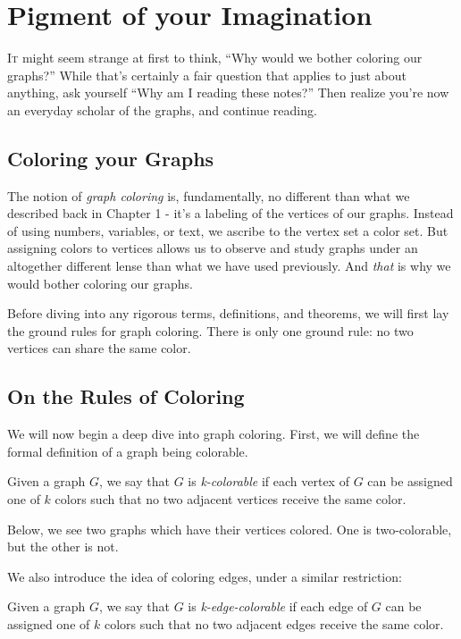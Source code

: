 \chapter{Pigment of your Imagination}
\lettrine[lines=4]{I}{t} might seem strange at first to think, ``Why would we bother coloring our graphs?'' While that's certainly a fair question that applies to just about anything, ask yourself ``Why am I reading these notes?'' Then realize you're now an everyday scholar of the graphs, and continue reading.

\section{Coloring your Graphs}

The notion of \textit{graph coloring} is, fundamentally, no different than what we described back in Chapter 1 - it's a labeling of the vertices of our graphs. Instead of using numbers, variables, or text, we ascribe to the vertex set a color set. But assigning colors to vertices allows us to observe and study graphs under an altogether different lense than what we have used previously. And \textit{that} is why we would bother coloring our graphs.

Before diving into any rigorous terms, definitions, and theorems, we will first lay the ground rules for graph coloring. There is only one ground rule: no two vertices can share the same color.

\section{On the Rules of Coloring}
We will now begin a deep dive into graph coloring. First, we will define the formal definition of a graph being colorable.

\begin{definition}[K-Colorable] 
    Given a graph $G$, we say that $G$ is \textit{k-colorable} if each vertex of $G$ can be assigned one of $k$ colors such that no two adjacent vertices receive the same color.
\end{definition}

Below, we see two graphs which have their vertices colored. One is two-colorable, but the other is not.


We also introduce the idea of coloring edges, under a similar restriction:

\begin{definition} 
    Given a graph $G$, we say that $G$ is \textit{k-edge-colorable} if each edge of $G$ can be assigned one of $k$ colors such that no two adjacent edges receive the same color.
\end{definition}

